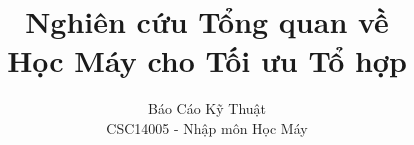 \documentclass{reportDoCS2025}
\title{Nghiên cứu Tổng quan về \\ Học Máy cho Tối ưu Tổ hợp}
\subtitle{Báo Cáo Kỹ Thuật \\ CSC14005 - Nhập môn Học Máy}
\begin{document}
\cover
\numRoman



\contents
\listTables
\listImages



\pageNumber



\end{document}
